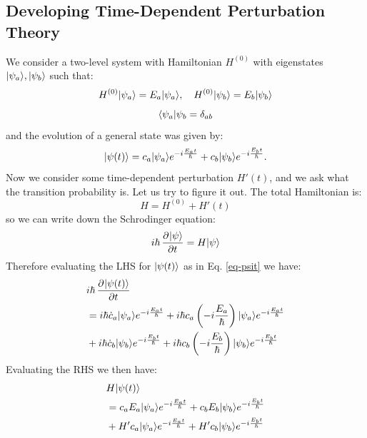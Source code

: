 \subsection{Developing Time-Dependent Perturbation Theory}
We consider a two-level system with Hamiltonian $H^{(0)}$ with eigenstates $\lvert \psi_a \rangle, \lvert \psi_b \rangle$ such that:
\begin{equation}
    H^{(0)}\lvert \psi_a \rangle = E_a\lvert \psi_a \rangle, \quad H^{(0)}\lvert \psi_b \rangle = E_b\lvert \psi_b \rangle
\end{equation}
\begin{equation}
    \langle \psi_a \rvert{\psi_b} = \delta_{ab}
\end{equation}
and the evolution of a general state was given by:
\begin{equation}\label{eq-psit}
    \lvert \psi(t) \rangle = c_a\lvert \psi_a \rangle e^{-i\frac{E_a t}{\hbar}}  + c_b\lvert \psi_b \rangle e^{-i\frac{E_b t}{\hbar}}.
\end{equation}
Now we consider some time-dependent perturbation $H'(t)$, and we ask what the transition probability is. Let us try to figure it out. The total Hamiltonian is:
\begin{equation}
    H = H^{(0)} + H'(t)
\end{equation}
so we can write down the Schrodinger equation:
\begin{equation}
    i\hbar \dpd{\ket{\psi}}{t} = H\ket{\psi}
\end{equation}
Therefore evaluating the LHS for $\lvert \psi(t) \rangle$ as in Eq. \eqref{eq-psit} we have:
\begin{equation}
    \begin{split}
        &i\hbar \dpd{\ket{\psi(t)}}{t}
        \\ &= i\hbar\dot{c}_a\ket{\psi_a}e^{-i\frac{E_at}{\hbar}} + i\hbar c_a\left(-i\frac{E_a}{\hbar}\right)\ket{\psi_a}e^{-i\frac{E_a t}{\hbar}}
        \\ &+ i\hbar\dot{c}_b\ket{\psi_b}e^{-i\frac{E_bt}{\hbar}} + i\hbar c_b\left(-i\frac{E_b}{\hbar}\right)\ket{\psi_b}e^{-i\frac{E_b t}{\hbar}}
    \end{split}
\end{equation}
Evaluating the RHS we then have:
\begin{equation}
    \begin{split}
        &H\lvert \psi(t) \rangle 
        \\ &= c_aE_a\lvert \psi_a \rangle e^{-i\frac{E_at}{\hbar}} + c_bE_b\lvert \psi_b \rangle e^{-i\frac{E_b t}{\hbar}}
        \\ &+ H'c_a\lvert \psi_a \rangle e^{-i\frac{E_a t}{\hbar}} + H'c_b\lvert \psi_b \rangle e^{-i\frac{E_b t}{\hbar}}
    \end{split}
\end{equation}
